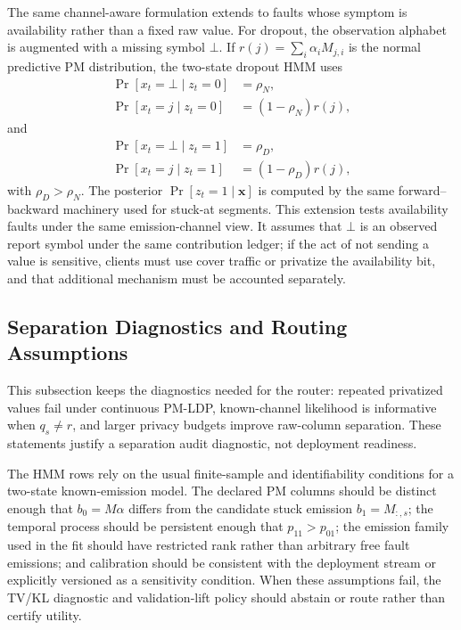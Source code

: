 \documentclass[conference]{IEEEtran}
\begin{document}
The same channel-aware formulation extends to faults whose symptom is availability rather than a fixed raw value. For dropout, the observation alphabet is augmented with a missing symbol \(\bot\). If \(r(j)=\sum_i\alpha_iM_{j,i}\) is the normal predictive PM distribution, the two-state dropout HMM uses
\[
\begin{aligned}
\Pr[x_t=\bot\mid z_t=0]&=\rho_N,\\
\Pr[x_t=j\mid z_t=0]&=(1-\rho_N)r(j),
\end{aligned}
\]
and
\[
\begin{aligned}
\Pr[x_t=\bot\mid z_t=1]&=\rho_D,\\
\Pr[x_t=j\mid z_t=1]&=(1-\rho_D)r(j),
\end{aligned}
\]
with \(\rho_D>\rho_N\). The posterior \( \Pr[z_t=1\mid \mathbf{x}]\) is computed by the same forward--backward machinery used for stuck-at segments. This extension tests availability faults under the same emission-channel view. It assumes that \(\bot\) is an observed report symbol under the same contribution ledger; if the act of not sending a value is sensitive, clients must use cover traffic or privatize the availability bit, and that additional mechanism must be accounted separately.

\subsection{Separation Diagnostics and Routing Assumptions}
\label{sec:theory}

This subsection keeps the diagnostics needed for the router: repeated privatized values fail under continuous PM-LDP, known-channel likelihood is informative when \(q_s\ne r\), and larger privacy budgets improve raw-column separation. These statements justify a separation audit diagnostic, not deployment readiness. 

The HMM rows rely on the usual finite-sample and identifiability conditions for a two-state known-emission model. The declared PM columns should be distinct enough that \(b_0=M\alpha\) differs from the candidate stuck emission \(b_1=M_{:,s}\); the temporal process should be persistent enough that \(p_{11}>p_{01}\); the emission family used in the fit should have restricted rank rather than arbitrary free fault emissions; and calibration should be consistent with the deployment stream or explicitly versioned as a sensitivity condition. When these assumptions fail, the TV/KL diagnostic and validation-lift policy should abstain or route rather than certify utility.
\end{document}
